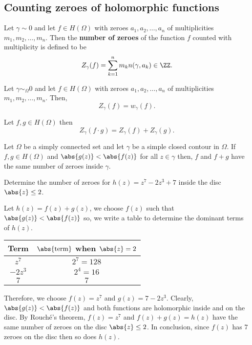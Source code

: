 \documentclass[12pt, a4paper]{article}
\begin{document}
\subsection{Counting zeroes of holomorphic functions}

\begin{definition}
    Let \(\gamma \sim 0\) and let \(f \in H(\Omega)\) with zeroes \(a_1,a_2,\ldots,a_n\) of multiplicities \(m_1,m_2,\ldots,m_n\). Then the \textbf{number of zeroes} of the function \(f\) counted with multiplicity is defined to be 
    \[Z_{\gamma}(f) = \sum_{k=1}^n m_k n(\gamma,a_k) \in \ZZ.\]
\end{definition}

\begin{mdthm}
    Let \(\gamma \sim_{\Omega} 0\) and let \(f \in H(\Omega)\) with zeroes \(a_1,a_2, \ldots,a_n\) of multiplicities \\ \(m_1,m_2,\ldots,m_n\). Then,
    \[Z_{\gamma}(f) = w_{\gamma}(f).\]
\end{mdthm}

\begin{corollary}
    Let \(f,g \in H(\Omega)\) then 
    \[Z_{\gamma}(f\cdot g) =Z_{\gamma}(f) + Z_{\gamma}(g).\]
\end{corollary}

\begin{mdthm}
    Let \(\Omega\) be a simply connected set and let \(\gamma\) be a simple closed contour in \(\Omega\). If \(f,g \in H(\Omega)\) and \(\abs{g(z)}<\abs{f(z)}\) for all \(z \in \gamma\) then, \(f\) and \(f+g\) have the same number of zeroes inside \(\gamma\).
\end{mdthm}

\begin{mdexample}
    Determine the number of zeroes for \(h(z)=z^7-2z^3+7\) inside the disc \(\abs{z}\leq 2\).
    \begin{solution}
        Let \(h(z)=f(z)+g(z)\), we choose \(f(z)\) such that \(\abs{g(z)}<\abs{f(z)}\) so, we write a table to determine the dominant terms of \(h(z)\).
            \begin{table}[H]
                \centering
                \begin{tabular}{c|c}
                Term & \(\abs{\text{term}}\) when \(\abs{z}=2\) \\ \hline
                \(z^7\)   & \(2^7=128\)     \\ 
                \(-2z^3\) & \(2^4=16\)     \\ 
                \(7\)    & \(7\)     \\ 
                \end{tabular}
                \end{table}
        \noindent Therefore, we choose \(f(z)=z^7\) and \(g(z)=7-2z^3\). Clearly, \(\abs{g(z)}<\abs{f(z)}\) and both functions are holomorphic inside and on the disc. By Rouché's theorem, \(f(z)=z^7\) and \(f(z)+g(z)=h(z)\) have the same number of zeroes on the disc \(\abs{z}\leq 2\). In conclusion, since \(f(z)\) has \(7\) zeroes on the disc then so does \(h(z)\). 
    \end{solution}
\end{mdexample}
\end{document}
